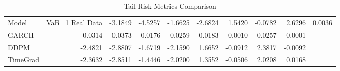\begin{table}
\caption{Tail Risk Metrics Comparison}
\label{tab:tail_risk}
\begin{tabular}{lrrrrrrrr}
\toprule
Model & VaR_1%
\midrule
Real Data & -3.1849 & -4.5257 & -1.6625 & -2.6824 & 1.5420 & -0.0782 & 2.6296 & 0.0036 \\
GARCH & -0.0314 & -0.0373 & -0.0176 & -0.0259 & 0.0183 & -0.0010 & 0.0257 & -0.0001 \\
DDPM & -2.4821 & -2.8807 & -1.6719 & -2.1590 & 1.6652 & -0.0912 & 2.3817 & -0.0092 \\
TimeGrad & -2.3632 & -2.8511 & -1.4446 & -2.0200 & 1.3552 & -0.0506 & 2.0208 & 0.0168 \\
\bottomrule
\end{tabular}
\end{table}
